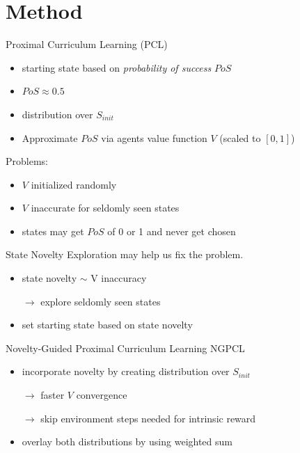 \documentclass[aspectratio=169]{beamer}
\begin{document}
\section{Method}
\begin{frame}{Proximal Curriculum Learning (PCL)~\cite{prox_curr}}
  \begin{itemize}
    \item starting state based on \textit{probability of success} $PoS$
    \item $PoS \approx 0.5$
    \item distribution over $S_{init}$
    \item Approximate $PoS$ via agents value function $V$ (scaled to $[0, 1]$)
  \end{itemize}
  \vfill
  \pause
  Problems:
  \begin{itemize}
    \item $V$ initialized randomly
    \item $V$ inaccurate for seldomly seen states
    \item states may get $PoS$ of 0 or 1 and never get chosen
  \end{itemize}
\end{frame}

\begin{frame}{State Novelty}
  Exploration may help us fix the problem.
  \begin{itemize}
    \item state novelty $\sim$ V inaccuracy
    \item[$\rightarrow$] explore seldomly seen states
    \item set starting state based on state novelty
  \end{itemize}
\end{frame}

\begin{frame}{Novelty-Guided Proximal Curriculum Learning NGPCL}
  \begin{itemize}
    \item incorporate novelty by creating distribution over $S_{init}$
    \item[$\rightarrow$] faster $V$ convergence
    \item[$\rightarrow$] skip environment steps needed for intrinsic reward
    \item overlay both distributions by using weighted sum
  \end{itemize}
\end{frame}
\end{document}

